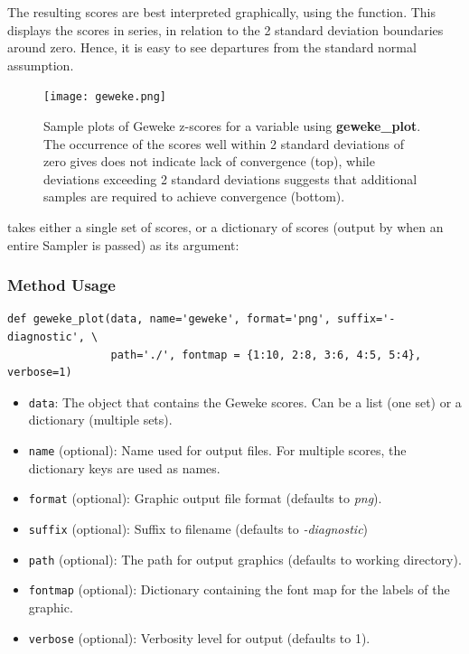 The resulting scores are best interpreted graphically, using the  function. This displays the scores in series, in relation to the 2 standard deviation boundaries around zero. Hence, it is easy to see departures from the standard normal assumption.

\begin{figure}[ht]
\begin{center}
\texttt{[image: geweke.png]}
\caption{Sample plots of Geweke z-scores for a variable using \textbf{geweke_plot}. The occurrence of the scores well within 2 standard deviations of zero gives does not indicate lack of convergence (top), while deviations exceeding 2 standard deviations suggests that additional samples are required to achieve convergence (bottom).}
\label{fig:geweke}
\end{center}
\end{figure}

 takes either a single set of scores, or a dictionary of scores (output by  when an entire Sampler is passed) as its argument:

\subsubsection*{Method Usage}
\begin{verbatim}
def geweke_plot(data, name='geweke', format='png', suffix='-diagnostic', \
                path='./', fontmap = {1:10, 2:8, 3:6, 4:5, 5:4}, verbose=1)
\end{verbatim}
\begin{itemize}

\item \verb=data=: The object that contains the Geweke scores. Can be a list (one set) or a dictionary (multiple sets).

\item \verb=name= (optional): Name used for output files. For multiple scores, the dictionary keys are used as names.

\item \verb=format= (optional): Graphic output file format (defaults to \emph{png}).

\item \verb=suffix= (optional): Suffix to filename (defaults to \emph{-diagnostic})

\item \verb=path= (optional): The path for output graphics (defaults to working directory).

\item \verb=fontmap= (optional): Dictionary containing the font map for the labels of the graphic.

\item \verb=verbose= (optional): Verbosity level for output (defaults to 1).
\end{itemize}

